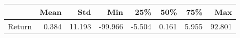 \begin{tabular}{lrrrrrrr}
\toprule
{} &   Mean &     Std &     Min &    25\% &    50\% &    75\% &     Max \\
\midrule
Return &  0.384 &  11.193 & -99.966 & -5.504 &  0.161 &  5.955 &  92.801 \\
\bottomrule
\end{tabular}
